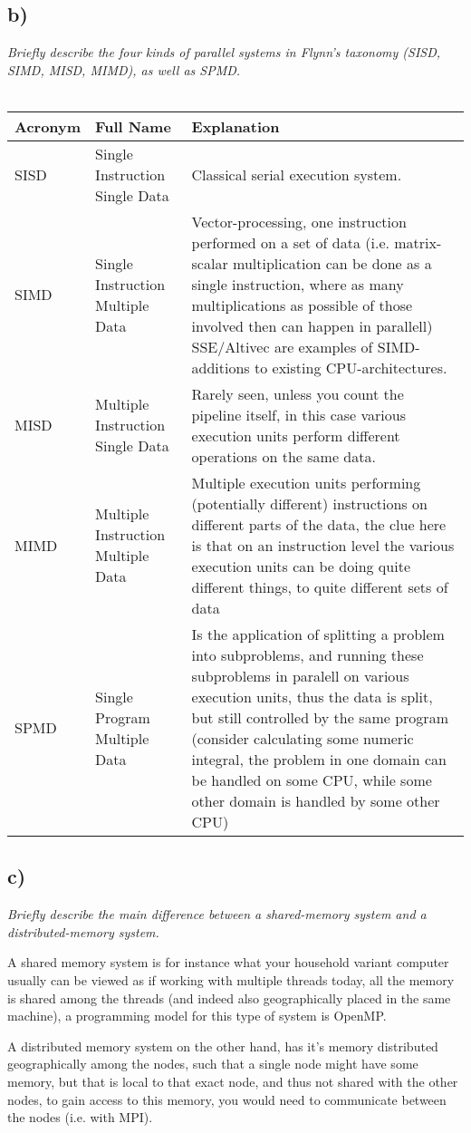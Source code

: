 \documentclass[a4paper]{article}
\begin{document}
\subsection*{b)} \textit{Briefly describe the four kinds of parallel systems in Flynn’s taxonomy (SISD, SIMD, MISD, MIMD),
as well as SPMD.}\\ \\
\begin{tabular}{ | l | l | p{8.4cm} | } \hline
\textbf{Acronym} & \textbf{Full Name} & \textbf{Explanation} \\ \hline
SISD & Single Instruction Single Data & Classical serial execution system. \\ \hline
SIMD & Single Instruction Multiple Data & Vector-processing, one instruction performed on a set of data (i.e. matrix-scalar multiplication can be done as a single instruction, where as many multiplications as possible of those involved then can happen in parallell) SSE/Altivec are examples of SIMD-additions to existing CPU-architectures. \\\hline
MISD & Multiple Instruction Single Data &  Rarely seen, unless you count the pipeline itself, in this case various execution units perform different operations on the same data.\\\hline
MIMD & Multiple Instruction Multiple Data & Multiple execution units performing (potentially different) instructions on different parts of the data, the clue here is that on an instruction level the various execution units can be doing quite different things, to quite different sets of data\\\hline
SPMD & Single Program Multiple Data & Is the application of splitting a problem into subproblems, and running these subproblems in paralell on various execution units, thus the data is split, but still controlled by the same program (consider calculating some numeric integral, the problem in one domain can be handled on some CPU, while some other domain is handled by some other CPU)\\ \hline
\end{tabular} 

\newpage

\subsection*{c)} \textit{Briefly describe the main difference between a shared-memory system and a distributed-memory
system.}

A shared memory system is for instance what your household variant computer usually can be viewed as if working with multiple threads today, all the memory is shared among the threads (and indeed also geographically placed in the same machine), a programming model for this type of system is OpenMP.

A distributed memory system on the other hand, has it's memory distributed geographically among the nodes, such that a single node might have some memory, but that is local to that exact node, and thus not shared with the other nodes, to gain access to this memory, you would need to communicate between the nodes (i.e. with MPI).
\end{document}
